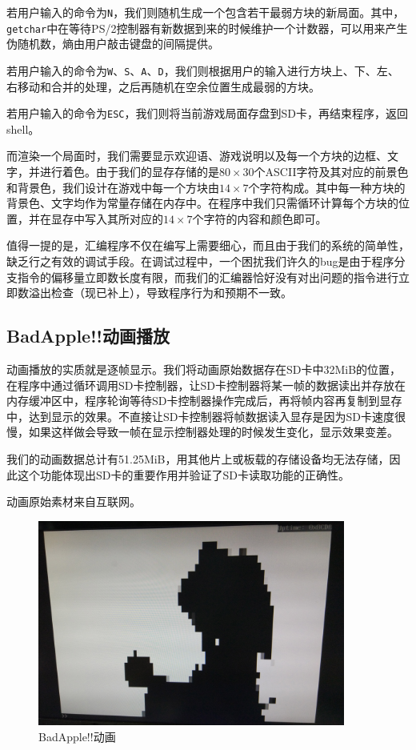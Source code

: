 \documentclass[11pt,utf8]{report}
\begin{document}
若用户输入的命令为\texttt{N}，我们则随机生成一个包含若干最弱方块的新局面。其中，\texttt{getchar}中在等待PS/2控制器有新数据到来的时候维护一个计数器，可以用来产生伪随机数，熵由用户敲击键盘的间隔提供。

若用户输入的命令为\texttt{W}、\texttt{S}、\texttt{A}、\texttt{D}，我们则根据用户的输入进行方块上、下、左、右移动和合并的处理，之后再随机在空余位置生成最弱的方块。

若用户输入的命令为\texttt{ESC}，我们则将当前游戏局面存盘到SD卡，再结束程序，返回shell。

而渲染一个局面时，我们需要显示欢迎语、游戏说明以及每一个方块的边框、文字，并进行着色。由于我们的显存存储的是$80 \times 30$个ASCII字符及其对应的前景色和背景色，我们设计在游戏中每一个方块由$14 \times 7$个字符构成。其中每一种方块的背景色、文字均作为常量存储在内存中。在程序中我们只需循环计算每个方块的位置，并在显存中写入其所对应的$14 \times 7$个字符的内容和颜色即可。

值得一提的是，汇编程序不仅在编写上需要细心，而且由于我们的系统的简单性，缺乏行之有效的调试手段。在调试过程中，一个困扰我们许久的bug是由于程序分支指令的偏移量立即数长度有限，而我们的汇编器恰好没有对出问题的指令进行立即数溢出检查（现已补上），导致程序行为和预期不一致。

\subsection{BadApple!!动画播放} 
	\par 动画播放的实质就是逐帧显示。我们将动画原始数据存在SD卡中32MiB的位置，在程序中通过循环调用SD卡控制器，让SD卡控制器将某一帧的数据读出并存放在内存缓冲区中，程序轮询等待SD卡控制器操作完成后，再将帧内容再复制到显存中，达到显示的效果。不直接让SD卡控制器将帧数据读入显存是因为SD卡速度很慢，如果这样做会导致一帧在显示控制器处理的时候发生变化，显示效果变差。
	\par 我们的动画数据总计有51.25MiB，用其他片上或板载的存储设备均无法存储，因此这个功能体现出SD卡的重要作用并验证了SD卡读取功能的正确性。
	\par 动画原始素材来自互联网。
	
	\begin{center}
	\begin{figure}[H]
			\centering
			\includegraphics[width=0.9\textwidth]{badapple.jpg}
			\caption{BadApple!!动画}
		\end{figure}
	\end{center}
\end{document}
